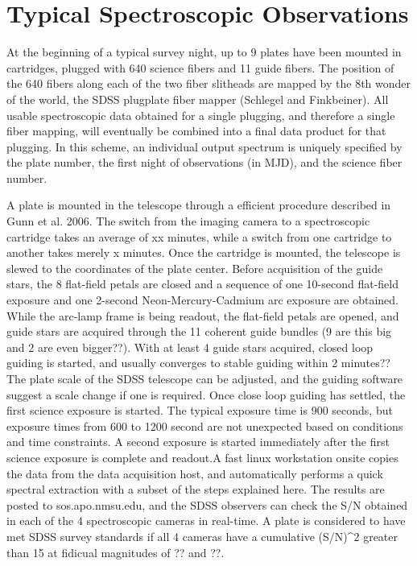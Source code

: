 \documentclass[12pt,preprint]{aastex}
\begin{document}
\section{Typical Spectroscopic Observations}
\label{sec_observ}

At the beginning of a typical survey night, up to 9 plates have been mounted
in cartridges, plugged with 640 science fibers and 11 guide fibers. 
The position of the 640 fibers along each of the two fiber slitheads
are mapped by the 8th wonder of the world,
the SDSS plugplate fiber mapper (Schlegel and Finkbeiner).
All usable spectroscopic data obtained for a single plugging, 
and therefore a single fiber mapping, will eventually be combined into 
a final data product for that plugging.  In this scheme, an individual 
output spectrum is uniquely specified by the plate number, the first night
of observations (in MJD), and the science fiber number.

A plate is mounted in the telescope through a efficient procedure described
in Gunn et al. 2006.  The switch from the imaging camera to a spectroscopic
cartridge takes an average of xx minutes, while a switch from one cartridge
to another takes merely x minutes.  Once the cartridge is mounted, the telescope is slewed to the coordinates of the plate center.  
Before acquisition of the guide stars, the 8 flat-field petals are closed and
a sequence of one 10-second flat-field exposure and one 2-second 
Neon-Mercury-Cadmium arc exposure are obtained.  While the arc-lamp frame is
being readout, the flat-field petals are opened, and guide stars are acquired
through the 11 coherent guide bundles (9 are this big and 2 are even bigger??).
With at least 4 guide stars acquired, closed loop guiding is started, and
usually converges to stable guiding within 2 minutes??
The plate scale of the SDSS telescope can be adjusted, and the guiding software
suggest a scale change if one is required.  Once close loop 
guiding has settled, the first science exposure is started.  The typical 
exposure time is 900 seconds, but exposure times from 600 to 1200 second are
not unexpected based on conditions and time constraints.  A second exposure
is started immediately after the first science exposure is complete and readout.A fast linux workstation onsite copies the data from the data acquisition host,
and automatically performs a quick spectral extraction with a subset of the 
steps explained here.  The results are posted to sos.apo.nmsu.edu, and
the SDSS observers can check the S/N obtained in each of the 4 spectroscopic
cameras in real-time.  A plate is considered to have met SDSS survey standards
if all 4 cameras have a cumulative (S/N)^2 greater than 15 at 
fidicual magnitudes of ?? and ??.  
\end{document}
